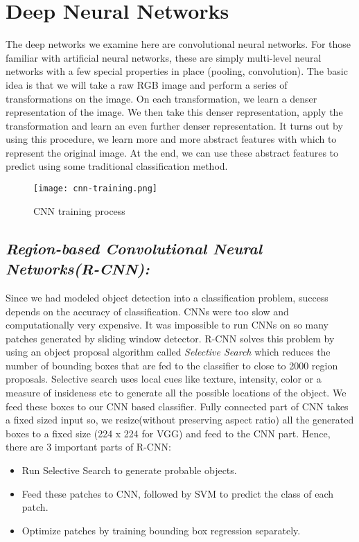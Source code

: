 		
	\section{Deep Neural Networks}
	\label{sec:Deep Neural Networks}
		The  deep  networks  we  examine  here  are  convolutional neural networks. For those familiar with artificial neural  networks,  these are  simply  multi-level  neural  networks with a few special properties in place (pooling, convolution). The basic idea is that we will take a raw RGB image and perform a series of transformations on the image. On each transformation, we learn a denser representation of the image. We then take this denser representation, apply the transformation and learn an even further denser representation.  It turns out by using this procedure, we learn more and more abstract features with which to represent the original image.  At the end, we can use these abstract features to predict using some traditional classification method.
		\begin{figure}[htbp]
			\centering
			\texttt{[image: cnn-training.png]}
			\caption{CNN training process\label{CNN training process}}
		\end{figure}
	
	\subsection{\emph{Region-based Convolutional Neural Networks(R-CNN):}}
		Since we had modeled object detection into a classification problem, success depends on the accuracy of classification. CNNs were too slow and computationally very expensive. It was impossible to run CNNs on so many patches generated by sliding window detector. R-CNN solves this problem by using an object proposal algorithm called \emph{Selective Search} which reduces the number of bounding boxes that are fed to the classifier to close to 2000 region proposals. Selective search uses local cues like texture, intensity, color or a measure of insideness etc to generate all the possible locations of the object. We feed these boxes to our CNN based classifier. Fully connected part of CNN takes a fixed sized input so, we resize(without preserving aspect ratio) all the generated boxes to a fixed size (224 x 224 for VGG) and feed to the CNN part. Hence, there are 3 important parts of R-CNN:~\cite{objdet}
		
		\begin{itemize}
			\item Run Selective Search to generate probable objects.
			\item Feed these patches to CNN, followed by SVM to predict the class of each patch.
			\item Optimize patches by training bounding box regression separately.
		\end{itemize}
		

